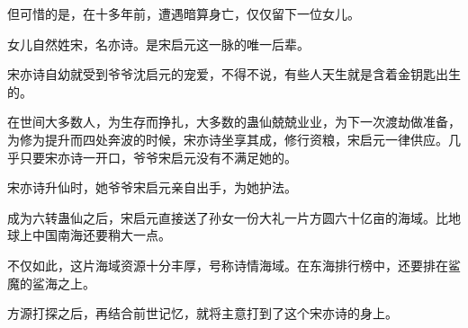 \begin{this_body}
但可惜的是，在十多年前，遭遇暗算身亡，仅仅留下一位女儿。

女儿自然姓宋，名亦诗。是宋启元这一脉的唯一后辈。

宋亦诗自幼就受到爷爷沈启元的宠爱，不得不说，有些人天生就是含着金钥匙出生的。

在世间大多数人，为生存而挣扎，大多数的蛊仙兢兢业业，为下一次渡劫做准备，为修为提升而四处奔波的时候，宋亦诗坐享其成，修行资粮，宋启元一律供应。几乎只要宋亦诗一开口，爷爷宋启元没有不满足她的。

宋亦诗升仙时，她爷爷宋启元亲自出手，为她护法。

成为六转蛊仙之后，宋启元直接送了孙女一份大礼一片方圆六十亿亩的海域。比地球上中国南海还要稍大一点。

不仅如此，这片海域资源十分丰厚，号称诗情海域。在东海排行榜中，还要排在鲨魔的鲨海之上。

方源打探之后，再结合前世记忆，就将主意打到了这个宋亦诗的身上。

\end{this_body}

